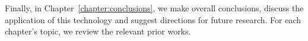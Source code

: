 Finally, in Chapter~\ref{chapter:conclusions}, we make overall conclusions, discuss the application of this technology and suggest directions for future research. For each chapter’s topic, we review the relevant prior works. 




